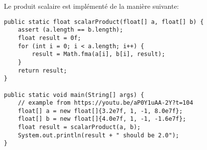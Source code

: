 Le produit scalaire est implémenté de la manière suivante:

\begin{verbatim}
public static float scalarProduct(float[] a, float[] b) {
    assert (a.length == b.length);
    float result = 0f;
    for (int i = 0; i < a.length; i++) {
        result = Math.fma(a[i], b[i], result);
    }
    return result;
}

public static void main(String[] args) {
    // example from https://youtu.be/aP0Y1uAA-2Y?t=104
    float[] a = new float[]{3.2e7f, 1, -1, 8.0e7f};
    float[] b = new float[]{4.0e7f, 1, -1, -1.6e7f};
    float result = scalarProduct(a, b);
    System.out.println(result + " should be 2.0");
}
\end{verbatim}